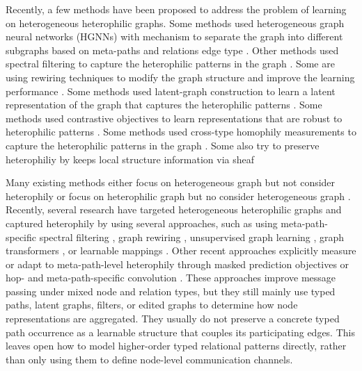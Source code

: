 Recently, a few methods have been proposed to address the problem of learning on heterogeneous heterophilic graphs. Some methods used heterogeneous graph neural networks (HGNNs) with mechanism to separate the graph into different subgraphs based on meta-paths and relations edge type \cite{lu2024h2sgnn,guo2023hdhgr,shen2024latgrl}. Other methods used spectral filtering to capture the heterophilic patterns in the graph \cite{lu2024h2sgnn,guo2023hdhgr}. Some are using rewiring techniques to modify the graph structure and improve the learning performance \cite{shen2024latgrl,wang2025hgms}. Some methods used latent-graph construction to learn a latent representation of the graph that captures the heterophilic patterns \cite{shen2024latgrl}. Some methods used contrastive objectives to learn representations that are robust to heterophilic patterns \cite{tao2025cthge}. Some methods used cross-type homophily measurements to capture the heterophilic patterns in the graph \cite{tao2025cthge}. Some also try to preserve heterophiliy by keeps local structure information via sheaf \cite{braithwaite2024hetsheaf}

Many existing methods either focus on heterogeneous graph but not consider heterophily \cite{hu2020heterogeneous,mao2023hinormer,he2024spectral,yang2023simple,wang2019heterogeneous,zhang2019heterogeneous} or focus on heterophilic graph but no consider heterogeneous graph \cite{grover2025spectro, yue2025graph,bodnar2022neural,ribeiro2026cooperative}. Recently, several research have targeted heterogeneous heterophilic graphs and captured heterophily by using several approaches, such as using meta-path-specific spectral filtering \cite{lu2026addressing}, graph rewiring \cite{guo2023homophily,tao2025cross}, unsupervised graph learning \cite{shen2025heterophily,wang2025homophily}, graph transformers \cite{lin2025heterophily}, or learnable mappings \cite{braithwaite2024heterogeneous}.
Other recent approaches explicitly measure or adapt to meta-path-level heterophily through masked prediction objectives \cite{li2025hetero2net} or hop- and meta-path-specific convolution \cite{chen2025adaptive}.
These approaches improve message passing under mixed node and relation types, but they still mainly use typed paths, latent graphs, filters, or edited graphs to determine how node representations are aggregated.
They usually do not preserve a concrete typed path occurrence as a learnable structure that couples its participating edges.
This leaves open how to model higher-order typed relational patterns directly, rather than only using them to define node-level communication channels.

